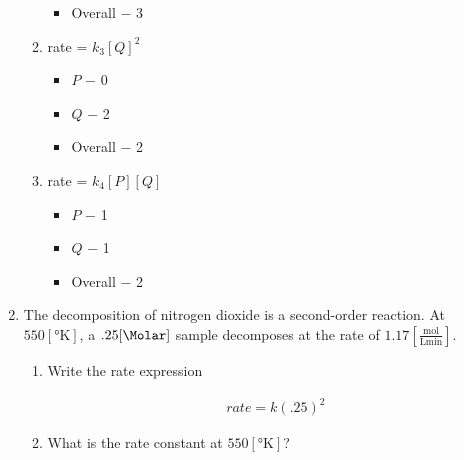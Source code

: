 \documentclass[12pt]{article}
\begin{document}
\begin{enumerate}
\begin{enumerate}
\begin{itemize}
          \item Overall $-$ 3

        \end{itemize}

      \item rate = $k_3[Q]^2$

        \begin{itemize}

          \item $P$ $-$ 0

          \item $Q$ $-$ 2

          \item Overall $-$ 2

        \end{itemize}

      \item rate = $k_4[P][Q]$

        \begin{itemize}

          \item $P$ $-$ 1

          \item $Q$ $-$ 1

          \item Overall $-$ 2

        \end{itemize}

    \end{enumerate}

    \setcounter{enumi}{18}

  \item The decomposition of nitrogen dioxide is a second-order reaction. At $550[\si{\degree\kelvin}]$, a $.25[\si{\Molar}]$ sample decomposes at the rate of $1.17\left[ \frac{\si{\mole}}{\si{\liter\minute}} \right]$.

    \begin{enumerate}

      \item Write the rate expression

        \begin{equation}
          \begin{split}
            rate=k(.25)^2
          \end{split}
          \label{2}
        \end{equation}

      \item What is the rate constant at $550[\si{\degree\kelvin}]$?


\end{enumerate}
\end{enumerate}
\end{document}
